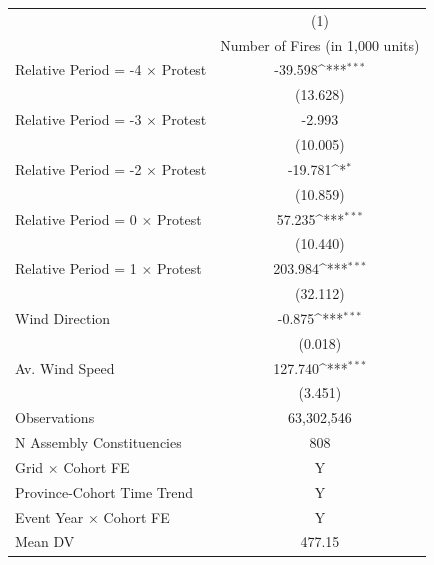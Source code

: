 {
\def\sym#1{\ifmmode^{#1}\else\(^{#1}\)\fi}
\begin{tabular}{l*{1}{c}}
\hline
            & \multicolumn{1}{c}{(1)}             \\
            & \multicolumn{1}{c}{Number of Fires (in 1,000 units)} \\ \hline

Relative Period = -4 $\times$ Protest&     -39.598\sym{***}\\
            &    (13.628)         \\
Relative Period = -3 $\times$ Protest&      -2.993         \\
            &    (10.005)         \\
Relative Period = -2 $\times$ Protest&     -19.781\sym{*}  \\
            &    (10.859)         \\
Relative Period = 0 $\times$ Protest&      57.235\sym{***}\\
            &    (10.440)         \\
Relative Period = 1 $\times$ Protest&     203.984\sym{***}\\
            &    (32.112)         \\
Wind Direction&      -0.875\sym{***}\\
            &     (0.018)         \\
Av. Wind Speed&     127.740\sym{***}\\
            &     (3.451)         \\
\hline
Observations&  63,302,546         \\
N Assembly Constituencies&         808         \\
Grid $\times$ Cohort FE&           Y         \\
Province-Cohort Time Trend&           Y         \\
Event Year $\times$ Cohort FE&           Y         \\
Mean DV     &      477.15         \\
\hline
\end{tabular}
}
